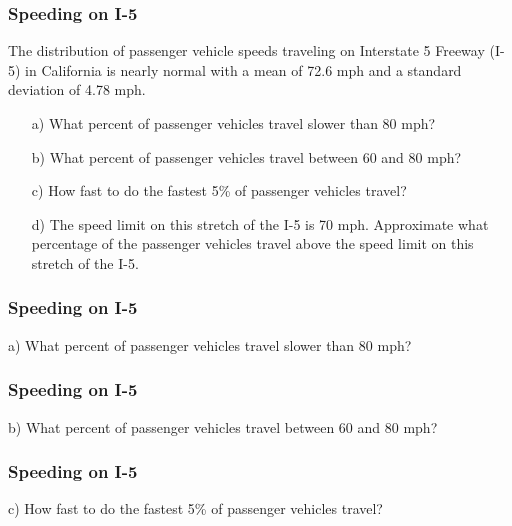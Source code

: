 \documentclass[handout]{beamer}
\begin{document}
\begin{frame}
\frametitle{Speeding on I-5}
The distribution of passenger vehicle speeds traveling on Interstate 5 Freeway (I-5) in California is nearly normal with a mean of 72.6 mph and a standard deviation of 4.78 mph.

\vspace{0.25cm}

\begin{enumerate}
\item[a)] What percent of passenger vehicles travel slower than 80 mph?
\item[b)] What percent of passenger vehicles travel between 60 and 80 mph?
\item[c)] How fast to do the fastest 5\% of passenger vehicles travel?
\item[d)] The speed limit on this stretch of the I-5 is 70 mph. Approximate what percentage of
the passenger vehicles travel above the speed limit on this stretch of the I-5.
\end{enumerate}

\end{frame}


\begin{frame}
\frametitle{Speeding on I-5}
a) What percent of passenger vehicles travel slower than 80 mph?

\vspace{7cm}

\end{frame}


\begin{frame}
\frametitle{Speeding on I-5}
b) What percent of passenger vehicles travel between 60 and 80 mph?

\vspace{7cm}

\end{frame}


\begin{frame}
\frametitle{Speeding on I-5}
c) How fast to do the fastest 5\% of passenger vehicles travel?

\vspace{7cm}

\end{frame}
\end{document}
